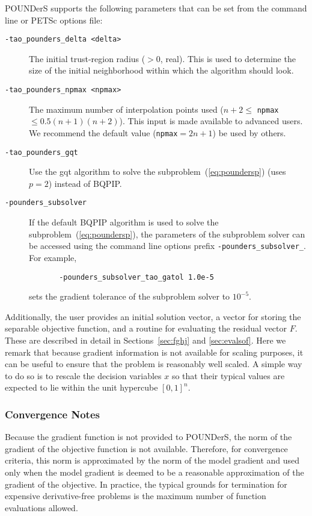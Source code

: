 POUNDerS supports the following parameters that can be set from the
command line or PETSc options file:
\begin{description}
  \item[\texttt{-tao\_pounders\_delta <delta>}] The initial trust-region 
  radius ($>0$, real).
  This is  used to determine the size of the initial neighborhood within
  which the algorithm should look. 
  
  \item[\texttt{-tao\_pounders\_npmax <npmax>}] The maximum number of 
  interpolation points used
  ($n+2\leq$ \texttt{npmax} $\leq 0.5(n+1)(n+2)$). This input is made
  available to advanced users. We recommend the default
  value (\texttt{npmax}$=2n+1$) be used by others.

  \item[\texttt{-tao\_pounders\_gqt}] Use the gqt algorithm to solve the
  subproblem~(\ref{eq:poundersp}) (uses $p=2$) instead of BQPIP.

  \item[\texttt{-pounders\_subsolver}] If the default
BQPIP algorithm is used to solve the 
  subproblem~(\ref{eq:poundersp}), the parameters of the subproblem solver
  can be accessed using the command line options  prefix
\texttt{-pounders\_subsolver\_}.  For example, 
\begin{verbatim}
       -pounders_subsolver_tao_gatol 1.0e-5
\end{verbatim}  
sets the gradient tolerance of the subproblem solver to $10^{-5}$.
\end{description}

Additionally,  the user provides an initial solution vector, a vector for
storing
the separable objective function, and a routine for evaluating the residual
vector $F$.  These are described in detail in 
Sections~\ref{sec:fghj} and \ref{sec:evalsof}. 
Here we remark that because gradient information is not available for
scaling purposes, it can be useful to ensure that the problem is
reasonably well scaled. A simple way to do so is to rescale the
decision variables $x$ so that their typical values are expected to lie
within the unit hypercube $[0,1]^n$.

\subsubsection{Convergence Notes}
Because the gradient function is not provided to POUNDerS, 
the norm of the gradient of the objective function is not available.
Therefore, 
for convergence criteria, this norm is approximated by the norm of the
model gradient and used only when the model gradient is deemed to be a
reasonable approximation of the gradient of the objective. In practice, the
typical grounds for termination for expensive derivative-free problems is
the maximum number of function evaluations allowed. 




